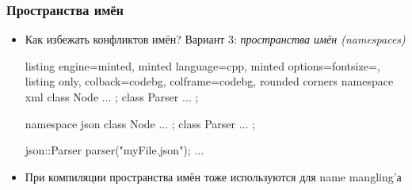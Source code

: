 \documentclass[10pt]{beamer}
\begin{document}
\begin{frame}[fragile]
\frametitle{Пространства имён}
\begin{itemize}
\item Как избежать конфликтов имён? Вариант 3: \textit{пространства имён (namespaces)}
\begin{tcblisting}{listing engine=minted, minted language=cpp, minted options={fontsize=\scriptsize}, listing only, colback=codebg, colframe=codebg, rounded corners}
namespace xml {
  class Node { ... };
  class Parser { ... };
}

namespace json {
  class Node { ... };
  class Parser { ... };
}

json::Parser parser("myFile.json");
...
\end{tcblisting}
\pause
\item При компиляции пространства имён тоже используются для name mangling'а
\end{itemize}
\end{frame}
\end{document}
